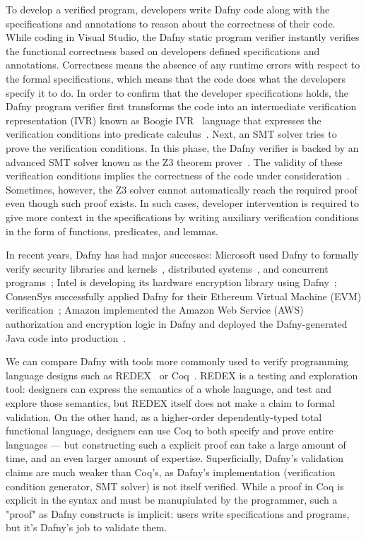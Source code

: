 To develop a verified program, developers write Dafny code along with the specifications and annotations to reason about the correctness of their code. While coding in Visual Studio, the Dafny static program verifier instantly verifies the functional correctness based on developers defined specifications and annotations. Correctness means the absence of any runtime errors with respect to the formal specifications, which means that the code does what the developers specify it to do. In order to confirm that the developer  specifications holds, the Dafny program verifier first transforms the code  into an intermediate verification representation (IVR) known as Boogie IVR~\cite{le2011boogie} language that expresses the verification conditions into predicate calculus~\cite{DBLP:journals/software/Leino17}. Next, an SMT solver tries to prove the verification conditions. In this phase, the Dafny verifier is backed by an advanced SMT solver known as the Z3 theorem prover~\cite{Z3-tacas2008}. The validity of these verification conditions implies the correctness of the code under consideration~\cite{DBLP:journals/software/Leino17}. Sometimes, however, the Z3 solver cannot automatically reach the required proof even though such proof exists. In such cases, developer intervention is required to give more context in the specifications by writing auxiliary verification conditions in the form of functions, predicates, and lemmas. 

In recent years, Dafny has had major successes: Microsoft used Dafny to formally verify security libraries and kernels~\cite{DBLP:conf/sosp/KleinEHACDEEKNSTW09,DBLP:journals/sigops/ErbsenPGSC20}, distributed systems~\cite{ironfleet-sosp2015}, and concurrent programs~\cite{DBLP:conf/osdi/HawblitzelHLNPZZ14}; Intel is developing its hardware encryption library using Dafny~\cite{DBLP:journals/iacr/YangWCCY23}; ConsenSys successfully applied Dafny for their Ethereum Virtual Machine (EVM) verification~\cite{cassex-eth-fm2023}; Amazon implemented the Amazon Web Service (AWS) authorization and encryption logic in Dafny and deployed the Dafny-generated Java code into production~\cite{counterexamples-tacas2022}.


We can compare Dafny with tools more commonly used to verify programming language designs such as REDEX~\cite{PLTRedex} or Coq~\cite{coq,coqbook}.  REDEX is a testing and exploration tool: designers can express the semantics of a whole language, and test and explore those semantics, but REDEX itself does not make a claim to formal validation. 
On the other hand, as a higher-order dependently-typed total functional language, designers can use Coq to both specify and prove entire languages --- but constructing such a explicit proof can take a large amount of time, and an even larger amount of expertise. 
Superficially, Dafny's validation claims are much weaker than Coq's, as Dafny's implementation (verification condition generator, SMT solver) is not itself verified.  While a proof in Coq is explicit in the syntax and must be manupiulated by the programmer, such a "proof" as Dafny constructs is implicit: users write specifications and programs, but it's Dafny's job to validate them.

